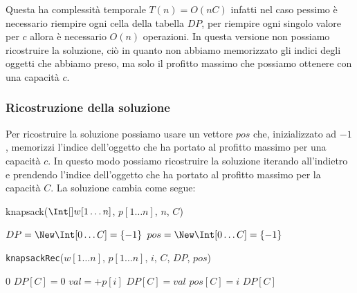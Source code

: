            Questa ha complessità temporale $T(n)=O(nC)$ infatti nel caso pessimo è necessario riempire ogni cella della tabella $DP$, per riempire ogni singolo valore per $c$ allora è necessario $O(n)$ operazioni.\newline
            In questa versione non possiamo ricostruire la soluzione, ciò in quanto non abbiamo memorizzato gli indici degli oggetti che abbiamo preso, ma solo il profitto massimo che possiamo ottenere con una capacità $c$.
            \subsubsection{Ricostruzione della soluzione}
                Per ricostruire la soluzione possiamo usare un vettore $pos$ che, inizializzato ad $-1$, memorizzi l'indice dell'oggetto che ha portato al profitto massimo per una capacità $c$. In questo modo possiamo ricostruire la soluzione iterando all'indietro e prendendo l'indice dell'oggetto che ha portato al profitto massimo per la capacità $C$. La soluzione cambia come segue:
                \begin{algorithm}[H]
                    \caption{\Int knapsack($\Int[] w[1 \ldots n]$, \Int[] $p[1 \ldots n]$, \Int $n$, \Int $C$)}
                    \begin{algorithmic}
                        \State \Int[] $DP = \New \Int[0\dots C] = \{-1\}$
                        \State \Int[] $pos = \New \Int[0\dots C] = \{-1\}$
                        \State {}
                        \State \Return {}
                    \end{algorithmic}
                \end{algorithm}
                \begin{algorithm}[H]
                    \caption{\Int \texttt{knapsackRec}(\Int[] $w[1 \ldots n]$, \Int[] $p[1 \ldots n]$, \Int $i$, \Int $C$, \Int[] $DP$, \Int[] $pos$)}
                    \begin{algorithmic}
                            \State \Return $0$
                        \EndIf
                            \State $DP[C]=0$
                                    \State \Int $val = $+$p[i]$
                                        \State $DP[C]=val$
                                        \State $pos[C]=i$
                                    \EndIf
                                \EndIf
                            \EndFor
                        \EndIf
                        \State \Return $DP[C]$
                    \end{algorithmic}
                \end{algorithm}
